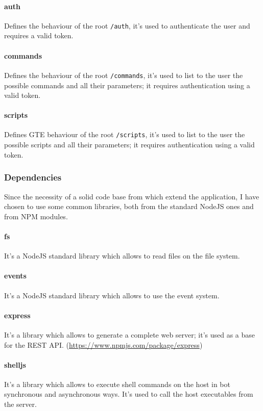 \documentclass[../PiTest.tex]{subfiles}
\begin{document}
    \paragraph{auth}
    Defines the behaviour of the root \texttt{/auth}, it's used to authenticate the user and requires a valid token.

    \paragraph{commands}
    Defines the behaviour of the root \texttt{/commands}, it's used to list to the user the possible commands and all their parameters; it requires authentication using a valid token.

    \paragraph{scripts}
    Defines GTE behaviour of the root \texttt{/scripts}, it's used to list to the user the possible scripts and all their parameters; it requires authentication using a valid token.

    \subsubsection{Dependencies}
    Since the necessity of a solid code base from which extend the application, I have chosen to use some common libraries, both from the standard NodeJS ones and from NPM modules.

    \paragraph{fs}
    It's a NodeJS standard library which allows to read files on the file system.

    \paragraph{events}
    It's a NodeJS standard library which allows to use the event system.

    \paragraph{express}
    It's a \npm library which allows to generate a complete web server; it's used as a base for the REST API. (\url{https://www.npmjs.com/package/express})

    \paragraph{shelljs}
    It's a \npm library which allows to execute shell commands on the host in bot synchronous and asynchronous ways. It's used to call the host executables from the server.
\end{document}
